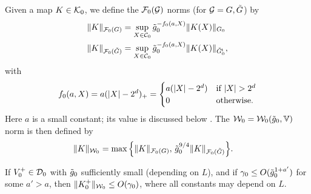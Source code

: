 Given a map $K \in \mathcal{K}_0$,
we define the $\mathcal{F}_0(\mathcal{G})$ norms (for $\mathcal{G} = G, \tilde G$) by
\begin{align}
\|K\|_{\mathcal{F}_0(G)}        &= \sup_{X\in\mathcal{C}_0} \tilde{g}_0^{-f_0(a, X)} \|K(X)\|_{G_0} \\
\|K\|_{\mathcal{F}_0(\tilde G)} &= \sup_{X\in\mathcal{C}_0}
\tilde{g}_0^{-f_0(a, X)} \|K(X)\|_{\tilde G_0^{\sf t}},
\end{align}
with
\begin{equation}
    \label{e:f0def}
    f_0 (a, X)
    =
    a (|X|-2^d)_+
    =
    \begin{cases}
    a (|X| - 2^d)
    & \text{if } |X| > 2^d   \\
    0
    & \text{otherwise}.
    \end{cases}
\end{equation}
Here $a$ is a small constant;  its value is discussed below \cite[\eqref{step-e:T0dom}]{BS-rg-step}.
The $\mathcal{W}_0 = \mathcal{W}_0(\tilde{g}_0, \mathbb{V})$ norm is then defined by
\begin{align}
\label{e:9Kcalnorm}
\|K\|_{\mathcal{W}_0}
  &=
  \max
  \Big\{
  \|K \|_{\mathcal{F}_0(G)},\,
  \tilde{g}_0^{9/4}
  \|K \|_{\mathcal{F}_0(\tilde{G})}
  \Big\}.
\end{align}

\begin{prop}
\label{prop:KWcal}
If $V_0^+ \in \mathcal{D}_0$ with $\tilde{g}_0$ sufficiently small
(depending on $L$), and if $\gamma_0 \le O(\tilde{g}_0^{1+a'})$
for some $a' >a$,
then $\|K_0^+\|_{\mathcal{W}_0} \le O(\gamma_0)$,
where all constants may depend on $L$.
\end{prop}

